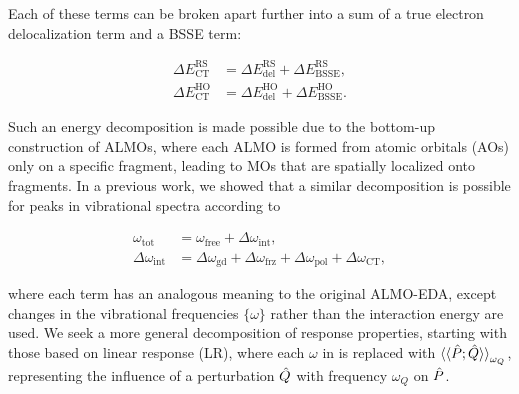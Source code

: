 Each of these terms can be broken apart further into a sum of a true electron delocalization term and a BSSE term:

\begin{equation}
  \begin{aligned}
    \label{eq:almo-eda-ct-bsse}
    \Delta E_{\text{CT}}^{\text{RS}} &= \Delta E_{\text{del}}^{\text{RS}} + \Delta E_{\text{BSSE}}^{\text{RS}}, \\
    \Delta E_{\text{CT}}^{\text{HO}} &= \Delta E_{\text{del}}^{\text{HO}} + \Delta E_{\text{BSSE}}^{\text{HO}}.
  \end{aligned}
\end{equation}

Such an energy decomposition is made possible due to the bottom-up construction of ALMOs, where each ALMO is formed from atomic orbitals (AOs) only on a specific fragment, leading to MOs that are spatially localized onto fragments. In a previous work\cite{Brinzer_2015_212425}, we showed that a similar decomposition is possible for peaks in vibrational spectra according to

\begin{equation}
  \begin{aligned}
    \label{eq:almo-frequencies}
    \omega_{\text{tot}} &= \omega_{\text{free}} + \Delta \omega_{\text{int}}, \\
    \Delta \omega_{\text{int}} &= \Delta \omega_{\text{gd}} + \Delta \omega_{\text{frz}} + \Delta \omega_{\text{pol}} + \Delta \omega_{\text{CT}},
  \end{aligned}
\end{equation}

where each term has an analogous meaning to the original ALMO-EDA, except changes in the vibrational frequencies \(\{\omega\}\) rather than the interaction energy are used. We seek a more general decomposition of response properties, starting with those based on linear response (LR), where each \(\omega\) in  is replaced with \(\braket{\braket{\hat{P}; \hat{Q}}}_{\omega_{Q}}\), representing the influence of a perturbation \(\hat{Q}\) with frequency \(\omega_{Q}\) on \(\hat{P}\).

